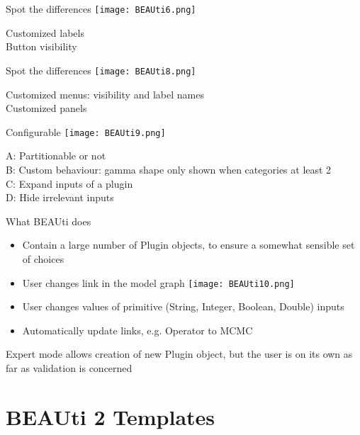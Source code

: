 \documentclass{beamer}
\theoremstyle{definition}
\begin{document}
\begin{frame}[containsverbatim]{Spot the differences}
\texttt{[image: BEAUti6.png]}

Customized labels\\
Button visibility
\end{frame}
\begin{frame}[containsverbatim]{Spot the differences}
\texttt{[image: BEAUti8.png]}

Customized menus: visibility and label names\\
Customized panels\\

\end{frame}

\begin{frame}[containsverbatim]{Configurable}
\texttt{[image: BEAUti9.png]}

A: Partitionable or not\\
B: Custom behaviour: gamma shape only shown when categories at least 2\\
C: Expand inputs of a plugin\\
D: Hide irrelevant inputs
\end{frame}


\begin{frame}[containsverbatim]{What BEAUti does}

\begin{itemize}
\item Contain a large number of Plugin objects, to ensure a somewhat sensible set of choices\\
\item User changes link in the model graph
\texttt{[image: BEAUti10.png]}\\
\item User changes values of primitive (String, Integer, Boolean, Double) inputs\\
\item Automatically update links, e.g. Operator to MCMC\vskip0.5cm
\end{itemize}

Expert mode allows creation of new Plugin object, but the user is on its own as far as validation is concerned

\end{frame}

\section{BEAUti 2 Templates}
\end{document}
